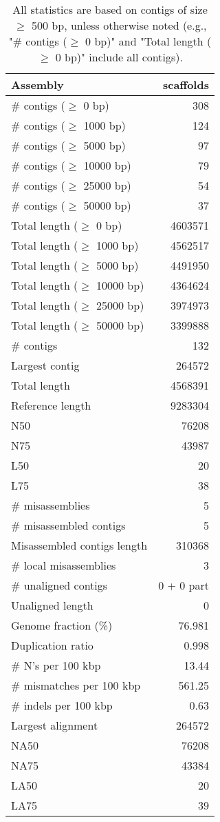 \documentclass[12pt,a4paper]{article}
\begin{document}
\begin{table}[ht]
\begin{center}
\caption{All statistics are based on contigs of size $\geq$ 500 bp, unless otherwise noted (e.g., "\# contigs ($\geq$ 0 bp)" and "Total length ($\geq$ 0 bp)" include all contigs).}
\begin{tabular}{|l*{1}{|r}|}
\hline
Assembly & scaffolds \\ \hline
\# contigs ($\geq$ 0 bp) & 308 \\ \hline
\# contigs ($\geq$ 1000 bp) & 124 \\ \hline
\# contigs ($\geq$ 5000 bp) & 97 \\ \hline
\# contigs ($\geq$ 10000 bp) & 79 \\ \hline
\# contigs ($\geq$ 25000 bp) & 54 \\ \hline
\# contigs ($\geq$ 50000 bp) & 37 \\ \hline
Total length ($\geq$ 0 bp) & 4603571 \\ \hline
Total length ($\geq$ 1000 bp) & 4562517 \\ \hline
Total length ($\geq$ 5000 bp) & 4491950 \\ \hline
Total length ($\geq$ 10000 bp) & 4364624 \\ \hline
Total length ($\geq$ 25000 bp) & 3974973 \\ \hline
Total length ($\geq$ 50000 bp) & 3399888 \\ \hline
\# contigs & 132 \\ \hline
Largest contig & 264572 \\ \hline
Total length & 4568391 \\ \hline
Reference length & 9283304 \\ \hline
N50 & 76208 \\ \hline
N75 & 43987 \\ \hline
L50 & 20 \\ \hline
L75 & 38 \\ \hline
\# misassemblies & 5 \\ \hline
\# misassembled contigs & 5 \\ \hline
Misassembled contigs length & 310368 \\ \hline
\# local misassemblies & 3 \\ \hline
\# unaligned contigs & 0 + 0 part \\ \hline
Unaligned length & 0 \\ \hline
Genome fraction (\%) & 76.981 \\ \hline
Duplication ratio & 0.998 \\ \hline
\# N's per 100 kbp & 13.44 \\ \hline
\# mismatches per 100 kbp & 561.25 \\ \hline
\# indels per 100 kbp & 0.63 \\ \hline
Largest alignment & 264572 \\ \hline
NA50 & 76208 \\ \hline
NA75 & 43384 \\ \hline
LA50 & 20 \\ \hline
LA75 & 39 \\ \hline
\end{tabular}
\end{center}
\end{table}
\end{document}
